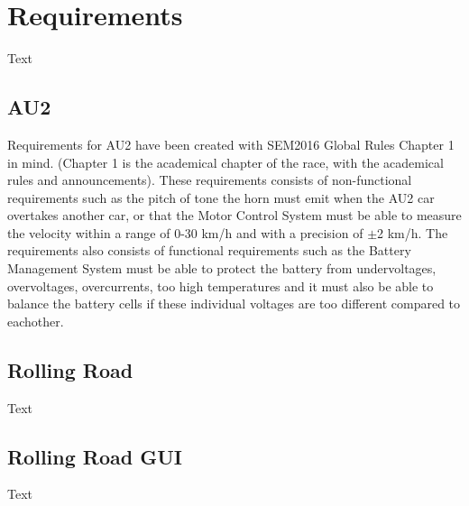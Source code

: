 \chapter{Requirements}
Text

\section{AU2}
Requirements for AU2 have been created with SEM2016 Global Rules Chapter 1 in mind. (Chapter 1 is the academical chapter of the race, with the academical rules and announcements). These requirements consists of non-functional requirements such as the pitch of tone the horn must emit when the AU2 car overtakes another car, or that the Motor Control System must be able to measure the velocity within a range of 0-30 km/h and with a precision of $\pm$2 km/h. The requirements also consists of functional requirements such as the Battery Management System must be able to protect the battery from undervoltages, overvoltages, overcurrents, too high temperatures and it must also be able to balance the battery cells if these individual voltages are too different compared to eachother.

\section{Rolling Road}
Text

\section{Rolling Road GUI}
Text